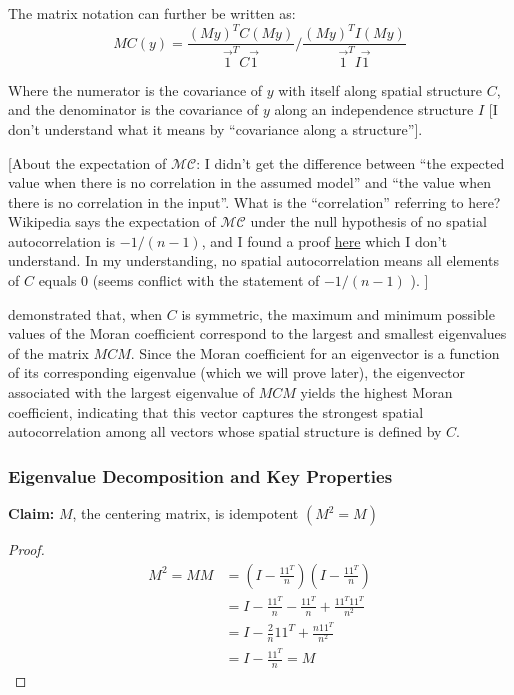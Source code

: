 \documentclass[12pt]{article}
\begin{document}
The matrix notation can further be written as:
\[
  M C (y) = \frac{(M y)^T C (M y)}{\vec{1}^T C \vec{1}} / \frac{(M y)^T I (M y)}{\vec{1}^T I \vec{1}}
\]

Where the numerator is the covariance of \( y \) with itself along spatial structure \( C \), and the denominator is the covariance of \( y \) along an independence structure \( I \) [I don't understand what it means by ``covariance along a structure''].

[About the expectation of \( \mathcal{M C} \): I didn't get the difference between ``the expected value when there is no correlation in the assumed model'' and ``the value when there is no correlation in the input''. What is the ``correlation'' referring to here? Wikipedia says the expectation of \( \mathcal{M C} \) under the null hypothesis of no spatial autocorrelation is \( -1 / (n - 1) \), and I found a proof \href{https://stats.stackexchange.com/questions/567411/expectation-and-variance-of-morans-i-under-the-null}{here} which I don't understand. In my understanding, no spatial autocorrelation means all elements of \( C \) equals 0 (seems conflict with the statement of \( -1 / (n - 1) \) ). ]


\citet{de1984extreme} demonstrated that, when \( C \) is symmetric, the maximum and minimum possible values of the Moran coefficient correspond to the largest and smallest eigenvalues of the matrix \( MCM \). Since the Moran coefficient for an eigenvector is a function of its corresponding eigenvalue (which we will prove later), the eigenvector associated with the largest eigenvalue of \( MCM \) yields the highest Moran coefficient, indicating that this vector captures the strongest spatial autocorrelation among all vectors whose spatial structure is defined by \( C \).

\subsubsection*{Eigenvalue Decomposition and Key Properties}

{\bf Claim:} \( M \), the centering matrix, is idempotent \( (M^2 = M) \)

\begin{proof}
  \begin{align*}
    M^2 = M M & = (I - \frac{1 1^T}{n}) (I - \frac{1 1^T}{n}) \\
              & = I - \frac{1 1^T}{n} - \frac{1 1^T}{n} + \frac{1 1^T 1 1^T}{n^2} \\
              & = I - \frac{2}{n} 1 1^T + \frac{n 1 1^T}{n^2} \\
              & = I - \frac{1 1^T}{n} = M
  \end{align*}
\end{proof}
\end{document}
